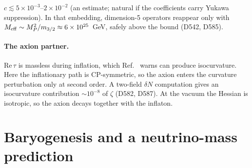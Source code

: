 \documentclass[aps,prd,twocolumn,superscriptaddress,nofootinbib,floatfix]{revtex4-2}
\begin{document}
$c\lesssim5\times10^{-3}$--$2\times10^{-2}$ (an estimate; natural if the coefficients carry Yukawa suppression). In that embedding, dimension-5 operators reappear only with $M_{\rm eff} \sim M_P^2/m_{3/2}\approx6\times10^{25}$~GeV, safely above the bound (D542, D585).

\paragraph{The axion partner.} $\mathrm{Re}\,\tau$ is massless during inflation, which Ref.~\cite{arXiv_2503_14904} warns can produce isocurvature. Here the inflationary path is CP-symmetric, so the axion enters the curvature perturbation only at second order. A two-field $\delta N$ computation gives an isocurvature contribution $\sim 10^{-8}$ of $\zeta$ (D582, D587). At the vacuum the Hessian is isotropic, so the axion decays together with the inflaton.

\section{Baryogenesis and a neutrino-mass prediction}\label{sec:baryo}
\end{document}
